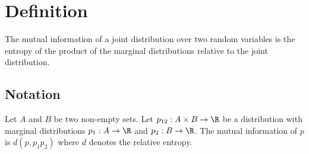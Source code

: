 

\section*{Definition}

The mutual information of a joint distribution over two random variables is the entropy of the product of the marginal distributions relative to the joint distribution.

\subsection*{Notation}

Let $A$ and $B$ be two non-empty sets.
Let $p_{12}: A \times  B \to \R $ be a distribution with marginal distributions $p_1: A \to \R $ and $p_2: B \to \R $.
The mutual information of $p$ is $d(p, p_1p_2)$ where $d$ denotes the relative entropy.

\blankpage